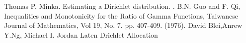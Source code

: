 \documentclass{article} %
\newcommand{\?}{\stackrel{?}{=}}
\begin{document}
\begin{thebibliography}{9}

Thomas P. Minka.
\newblock Estimating a Dirichlet distribution.
.
 B.N. Guo and F. Qi, 
\newblock Inequalities and Monotonicity for the Ratio of Gamma Functions,
\newblock Taiwanese Journal of Mathematics, 
\newblock Vol 19, No. 7. pp. 407-409. (1976).
David Blei,Anrew Y.Ng, Michael I. Jordan
\newblock Laten Drichlet Allocation
\newblock

\end{thebibliography}
\end{document}
